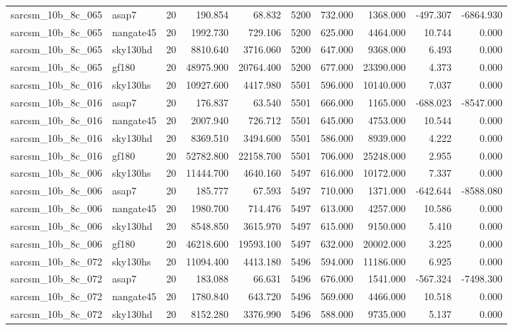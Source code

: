 \begin{longtable}{llrrrrrrrr}
sarcsm\_10b\_8c\_065 & asap7 & 20 & 190.854 & 68.832 & 5200 & 732.000 & 1368.000 & -497.307 & -6864.930 \\
sarcsm\_10b\_8c\_065 & nangate45 & 20 & 1992.730 & 729.106 & 5200 & 625.000 & 4464.000 & 10.744 & 0.000 \\
sarcsm\_10b\_8c\_065 & sky130hd & 20 & 8810.640 & 3716.060 & 5200 & 647.000 & 9368.000 & 6.493 & 0.000 \\
sarcsm\_10b\_8c\_065 & gf180 & 20 & 48975.900 & 20764.400 & 5200 & 677.000 & 23390.000 & 4.373 & 0.000 \\
sarcsm\_10b\_8c\_016 & sky130hs & 20 & 10927.600 & 4417.980 & 5501 & 596.000 & 10140.000 & 7.037 & 0.000 \\
sarcsm\_10b\_8c\_016 & asap7 & 20 & 176.837 & 63.540 & 5501 & 666.000 & 1165.000 & -688.023 & -8547.000 \\
sarcsm\_10b\_8c\_016 & nangate45 & 20 & 2007.940 & 726.712 & 5501 & 645.000 & 4753.000 & 10.544 & 0.000 \\
sarcsm\_10b\_8c\_016 & sky130hd & 20 & 8369.510 & 3494.600 & 5501 & 586.000 & 8939.000 & 4.222 & 0.000 \\
sarcsm\_10b\_8c\_016 & gf180 & 20 & 52782.800 & 22158.700 & 5501 & 706.000 & 25248.000 & 2.955 & 0.000 \\
sarcsm\_10b\_8c\_006 & sky130hs & 20 & 11444.700 & 4640.160 & 5497 & 616.000 & 10172.000 & 7.337 & 0.000 \\
sarcsm\_10b\_8c\_006 & asap7 & 20 & 185.777 & 67.593 & 5497 & 710.000 & 1371.000 & -642.644 & -8588.080 \\
sarcsm\_10b\_8c\_006 & nangate45 & 20 & 1980.700 & 714.476 & 5497 & 613.000 & 4257.000 & 10.586 & 0.000 \\
sarcsm\_10b\_8c\_006 & sky130hd & 20 & 8548.850 & 3615.970 & 5497 & 615.000 & 9150.000 & 5.410 & 0.000 \\
sarcsm\_10b\_8c\_006 & gf180 & 20 & 46218.600 & 19593.100 & 5497 & 632.000 & 20002.000 & 3.225 & 0.000 \\
sarcsm\_10b\_8c\_072 & sky130hs & 20 & 11094.400 & 4413.180 & 5496 & 594.000 & 11186.000 & 6.925 & 0.000 \\
sarcsm\_10b\_8c\_072 & asap7 & 20 & 183.088 & 66.631 & 5496 & 676.000 & 1541.000 & -567.324 & -7498.300 \\
sarcsm\_10b\_8c\_072 & nangate45 & 20 & 1780.840 & 643.720 & 5496 & 569.000 & 4466.000 & 10.518 & 0.000 \\
sarcsm\_10b\_8c\_072 & sky130hd & 20 & 8152.280 & 3376.990 & 5496 & 588.000 & 9735.000 & 5.137 & 0.000 \\

\end{longtable}
